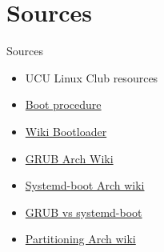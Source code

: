 \documentclass[usenames,dvipsnames,10pt,aspectratio=169]{beamer}
\begin{document}


\section{Sources}
\begin{frame}{Sources}
    \begin{itemize}
        \item UCU Linux Club resources
        \item \href{https://www.freecodecamp.org/news/uefi-vs-bios/}{Boot procedure}
        \item \href{https://en.wikipedia.org/wiki/Bootloader}{Wiki Bootloader}
        \item \href{https://wiki.archlinux.org/title/GRUB}{GRUB Arch Wiki}
        \item \href{https://wiki.archlinux.org/title/Systemd-boot}{Systemd-boot Arch wiki}
        \item \href{https://www.maketecheasier.com/grub-vs-systemd-boot/}{GRUB vs systemd-boot}
        \item \href{https://wiki.archlinux.org/title/Partitioning}{Partitioning Arch wiki}
    \end{itemize}
\end{frame}
\end{document}
